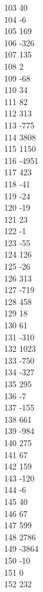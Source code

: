 { 103	40 \\
 104	-6 \\
 105	169 \\
 106	-326 \\
 107	135 \\
 108	2 \\
 109	-68 \\
 110	34 \\
 111	82 \\
 112	313 \\
 113	-775 \\
 114	3808 \\
 115	1150 \\
 116	-4951 \\
 117	423 \\
 118	-41 \\
 119	-24 \\
 120	-19 \\
 121	23 \\
 122	-1 \\
 123	-55 \\
 124	126 \\
 125	-26 \\
 126	313 \\
 127	-719 \\
 128	458 \\
 129	18 \\
 130	61 \\
 131	-310 \\
 132	1023 \\
 133	-750 \\
 134	-327 \\
 135	295 \\
 136	-7 \\
 137	-155 \\
 138	661 \\
 139	-984 \\
 140	275 \\
 141	67 \\
 142	159 \\
 143	-120 \\
 144	-6 \\
 145	40 \\
 146	67 \\
 147	599 \\
 148	2786 \\
 149	-3864 \\
 150	-10 \\
 151	0 \\
 152	232 \\
}
